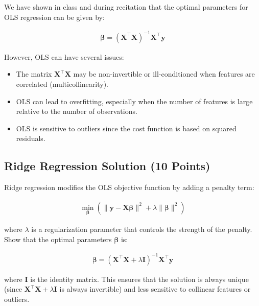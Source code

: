 \documentclass{article}
\begin{document}
We have shown in class and during recitation that the optimal parameters for OLS regression can be given by:

\begin{align}
\boldsymbol{\beta} = (\mathbf{X}^\top \mathbf{X})^{-1} \mathbf{X}^\top \mathbf{y}
\end{align}

However, OLS can have several issues:
\begin{itemize}
    \item The matrix $\mathbf{X}^\top \mathbf{X}$ may be non-invertible or ill-conditioned when features are correlated (multicollinearity).
    \item OLS can lead to overfitting, especially when the number of features is large relative to the number of observations.
    \item OLS is sensitive to outliers since the cost function is based on squared residuals.
\end{itemize}

\subsection{Ridge Regression Solution (10 Points)}
Ridge regression modifies the OLS objective function by adding a penalty term:

\begin{align}
\min_{\boldsymbol{\beta}} \left( \|\mathbf{y} - \mathbf{X} \boldsymbol{\beta}\|^2 + \lambda \|\boldsymbol{\beta}\|^2 \right)
\end{align}

where $\lambda$ is a regularization parameter that controls the strength of the penalty. Show that the optimal parameters $\boldsymbol{\beta}$ is:

\begin{align}
\boldsymbol{\beta} = (\mathbf{X}^\top \mathbf{X} + \lambda \mathbf{I})^{-1} \mathbf{X}^\top \mathbf{y}
\end{align}

where $\mathbf{I}$ is the identity matrix. This ensures that the solution is always unique (since $\mathbf{X}^\top \mathbf{X} + \lambda \mathbf{I}$ is always invertible) and less sensitive to collinear features or outliers.
\end{document}

